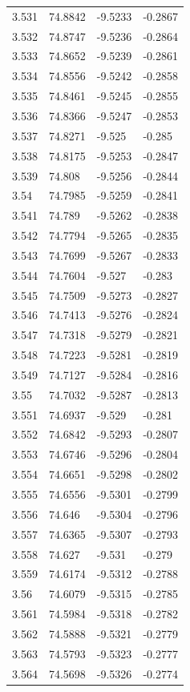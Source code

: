 \begin{tabular}{llll}
3.531 & 74.8842 & -9.5233 & -0.2867 \\
3.532 & 74.8747 & -9.5236 & -0.2864 \\
3.533 & 74.8652 & -9.5239 & -0.2861 \\
3.534 & 74.8556 & -9.5242 & -0.2858 \\
3.535 & 74.8461 & -9.5245 & -0.2855 \\
3.536 & 74.8366 & -9.5247 & -0.2853 \\
3.537 & 74.8271 & -9.525 & -0.285 \\
3.538 & 74.8175 & -9.5253 & -0.2847 \\
3.539 & 74.808 & -9.5256 & -0.2844 \\
3.54 & 74.7985 & -9.5259 & -0.2841 \\
3.541 & 74.789 & -9.5262 & -0.2838 \\
3.542 & 74.7794 & -9.5265 & -0.2835 \\
3.543 & 74.7699 & -9.5267 & -0.2833 \\
3.544 & 74.7604 & -9.527 & -0.283 \\
3.545 & 74.7509 & -9.5273 & -0.2827 \\
3.546 & 74.7413 & -9.5276 & -0.2824 \\
3.547 & 74.7318 & -9.5279 & -0.2821 \\
3.548 & 74.7223 & -9.5281 & -0.2819 \\
3.549 & 74.7127 & -9.5284 & -0.2816 \\
3.55 & 74.7032 & -9.5287 & -0.2813 \\
3.551 & 74.6937 & -9.529 & -0.281 \\
3.552 & 74.6842 & -9.5293 & -0.2807 \\
3.553 & 74.6746 & -9.5296 & -0.2804 \\
3.554 & 74.6651 & -9.5298 & -0.2802 \\
3.555 & 74.6556 & -9.5301 & -0.2799 \\
3.556 & 74.646 & -9.5304 & -0.2796 \\
3.557 & 74.6365 & -9.5307 & -0.2793 \\
3.558 & 74.627 & -9.531 & -0.279 \\
3.559 & 74.6174 & -9.5312 & -0.2788 \\
3.56 & 74.6079 & -9.5315 & -0.2785 \\
3.561 & 74.5984 & -9.5318 & -0.2782 \\
3.562 & 74.5888 & -9.5321 & -0.2779 \\
3.563 & 74.5793 & -9.5323 & -0.2777 \\
3.564 & 74.5698 & -9.5326 & -0.2774 \\

\end{tabular}
